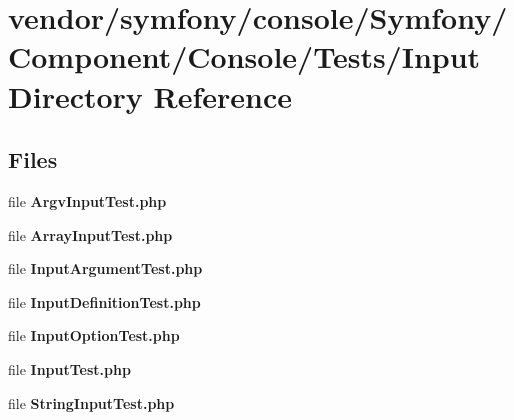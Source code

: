 \section{vendor/symfony/console/\+Symfony/\+Component/\+Console/\+Tests/\+Input Directory Reference}
\label{dir_2ad68dd840f673d773b79a58096efd44}
\subsection*{Files}
\begin{DoxyCompactItemize}
\item 
file {\bf Argv\+Input\+Test.\+php}
\item 
file {\bf Array\+Input\+Test.\+php}
\item 
file {\bf Input\+Argument\+Test.\+php}
\item 
file {\bf Input\+Definition\+Test.\+php}
\item 
file {\bf Input\+Option\+Test.\+php}
\item 
file {\bf Input\+Test.\+php}
\item 
file {\bf String\+Input\+Test.\+php}
\end{DoxyCompactItemize}
